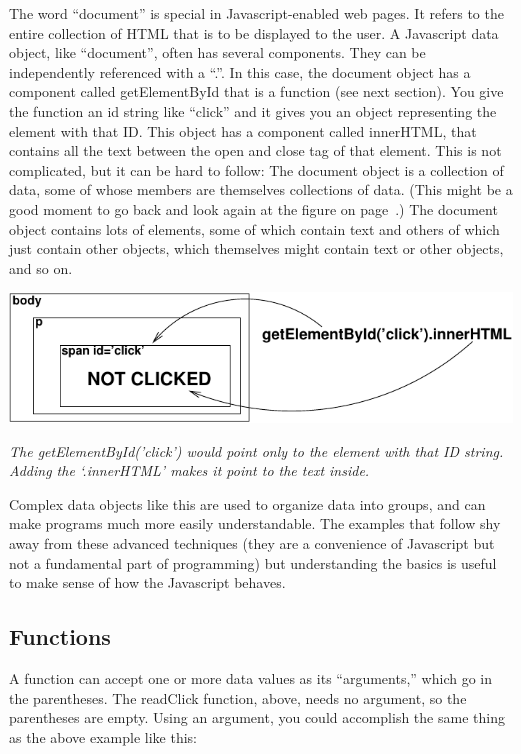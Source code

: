 \documentclass[11pt]{article}
\newcommand{\capt}[1]{\begin{minipage}{0.75\columnwidth}\itshape#1\end{minipage}}
\begin{document}
The word ``document'' is special in Javascript-enabled web pages.  It
refers to the entire collection of HTML that is to be displayed to the
user.  A Javascript data object, like ``document'', often has several
components.  They can be independently referenced with a ``.''.  In
this case, the document object has a component called getElementById
that is a function (see next section).  You give the function an id
string like ``click'' and it gives you an object representing the
element with that ID.  This object has a component called innerHTML,
that contains all the text between the open and close tag of that
element.  This is not complicated, but it can be hard to follow: The
document object is a collection of data, some of whose members are
themselves collections of data.  (This might be a good moment to go
back and look again at the figure on page~\pageref{htmlfig}.)  The
document object contains lots of elements, some of which contain text
and others of which just contain other objects, which themselves might
contain text or other objects, and so on.

\begin{center}
\includegraphics{not-clicked.pdf}

\capt{The getElementById('click') would point only to the element with that ID
  string.  Adding the `.innerHTML' makes it point to the text inside.}
\end{center}



Complex data objects like this are used to organize data into groups,
and can make programs much more easily understandable.  The examples
that follow shy away from these advanced techniques (they are a
convenience of Javascript but not a fundamental part of programming)
but understanding the basics is useful to make sense of how the
Javascript behaves.


\subsection{Functions}

A function can accept one or more data values as its ``arguments,''
which go in the parentheses.  The readClick function, above, needs no
argument, so the parentheses are empty.  Using an argument, you could
accomplish the same thing as the above example like this:
\end{document}
